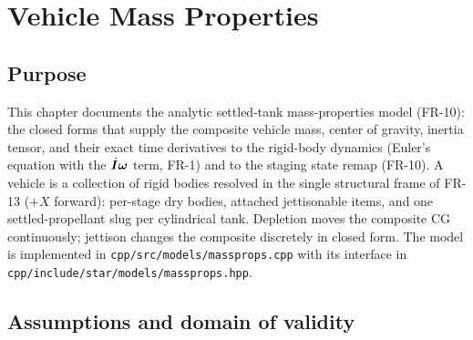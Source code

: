 \chapter{Vehicle Mass Properties}
\label{ch:massprops}

\section{Purpose}
\label{sec:massprops:purpose}

This chapter documents the analytic settled-tank mass-properties model
(FR-10): the closed forms that supply the composite vehicle mass, center
of gravity, inertia tensor, and their exact time derivatives to the
rigid-body dynamics (Euler's equation with the $\dot{\bm{I}}\bm{\omega}$
term, FR-1) and to the staging state remap (FR-10). A vehicle is a
collection of rigid bodies resolved in the single structural frame of
FR-13 ($+X$ forward): per-stage dry bodies, attached jettisonable items,
and one settled-propellant slug per cylindrical tank. Depletion moves the
composite CG continuously; jettison changes the composite discretely in
closed form. The model is implemented in
\texttt{cpp/src/models/massprops.cpp} with its interface in
\texttt{cpp/include/star/models/massprops.hpp}.

\section{Assumptions and domain of validity}
\label{sec:massprops:domain}

